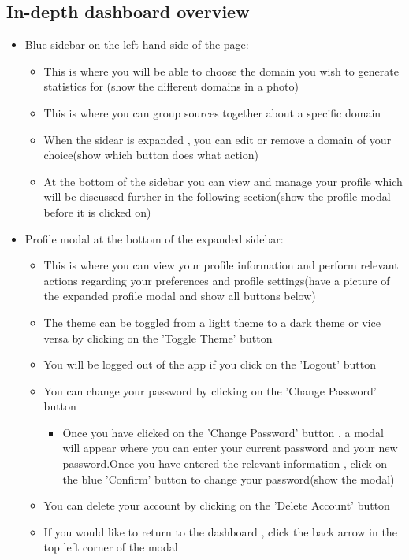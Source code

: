 \documentclass[12pt]{article}
\begin{document}
\subsection{In-depth dashboard overview}
\begin{itemize}
    \item Blue sidebar on the left hand side of the page:
    \begin{itemize}
        \item This is where you will be able to choose the domain you wish to generate statistics for (show the different domains in a photo)
        \item This is where you can group sources together about a specific domain
        \item When the sidear is expanded , you can edit or remove a domain of your choice(show which button does what action)
        \item At the bottom of the sidebar you can view and manage your profile which will be discussed further in the following section(show the profile modal before it is clicked on)
    \end{itemize}
    \item Profile modal at the bottom of the expanded sidebar:
    \begin{itemize}
        \item This is where you can view your profile information and perform relevant actions regarding your preferences and profile settings(have a picture of the expanded profile modal and show all buttons below)
        \item The theme can be toggled from a light theme to a dark theme or vice versa by clicking on the 'Toggle Theme' button
        \item You will be logged out of the app if you click on the 'Logout' button
        \item You can change your password by clicking on the 'Change Password' button
        \begin{itemize}
            \item Once you have clicked on the 'Change Password' button , a modal will appear where you can enter your current password and your new password.Once you have entered the relevant information , click on the blue 'Confirm' button to change your password(show the modal)
        \end{itemize}
        \item You can delete your account by clicking on the 'Delete Account' button
        \item If you would like to return to the dashboard , click the back arrow in the top left corner of the modal

\end{itemize}
\end{itemize}
\end{document}
